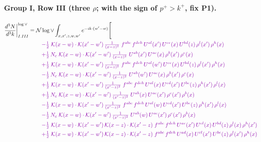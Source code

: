 \documentclass[10pt]{article}
\numberwithin{equation}{section}
\newcommand{\NNv}{\mathcal N\log\vee}
\begin{document}
\paragraph{Group I, Row III (three $\rho$; with the sign of $p^+>k^+$, fix P1).}
\begin{align}
\frac{d^3N}{d^3k}\bigg|^{\log\vee}_{I.III}={}&\NNv\int_{x,x',z,w,w'}e^{-ik\cdot(w'-w)}\Bigg[\notag\\
&\quad{\color{CC}-\tfrac{1}{2}\;\mathcal{K}(x-w)\cdot\mathcal{K}(x'-w')\,\tfrac{1}{(x-z)^{2}}\;f^{abc}\,f^{deh}\,U^{al}(x')\,U^{ce}(x)\,U^{bd}(z)\,\rho^{l}(x')\,\rho^{h}(x)}\notag\\
&\quad{\color{CC}+\tfrac{1}{2}\,N_c\;\mathcal{K}(x-w)\cdot\mathcal{K}(x'-w')\,\tfrac{1}{(x-z)^{2}}\;U^{ab}(x')\,U^{ac}(x)\,\rho^{b}(x')\,\rho^{c}(x)}\notag\\
&\quad{\color{CC}+\tfrac{1}{2}\;\mathcal{K}(x-w)\cdot\mathcal{K}(x'-w')\,\tfrac{1}{(x-z)^{2}}\;f^{abc}\,f^{deh}\,U^{al}(w')\,U^{ce}(x)\,U^{bd}(z)\,\rho^{l}(x')\,\rho^{h}(x)}\notag\\
&\quad{\color{CC}-\tfrac{1}{2}\,N_c\;\mathcal{K}(x-w)\cdot\mathcal{K}(x'-w')\,\tfrac{1}{(x-z)^{2}}\;U^{ab}(w')\,U^{ac}(x)\,\rho^{b}(x')\,\rho^{c}(x)}\notag\\
&\quad{\color{CC}+\tfrac{1}{2}\;\mathcal{K}(x-w)\cdot\mathcal{K}(x'-w')\,\tfrac{1}{(x'-z)^{2}}\;f^{abc}\,f^{deh}\,U^{al}(x)\,U^{cd}(x')\,U^{be}(z)\,\rho^{h}(x')\,\rho^{l}(x)}\notag\\
&\quad{\color{CC}+\tfrac{1}{2}\,N_c\;\mathcal{K}(x-w)\cdot\mathcal{K}(x'-w')\,\tfrac{1}{(x'-z)^{2}}\;U^{ab}(x)\,U^{ac}(x')\,\rho^{c}(x')\,\rho^{b}(x)}\notag\\
&\quad{\color{CC}-\tfrac{1}{2}\;\mathcal{K}(x-w)\cdot\mathcal{K}(x'-w')\,\tfrac{1}{(x'-z)^{2}}\;f^{abc}\,f^{deh}\,U^{al}(w)\,U^{cd}(x')\,U^{be}(z)\,\rho^{h}(x')\,\rho^{l}(x)}\notag\\
&\quad{\color{CC}-\tfrac{1}{2}\,N_c\;\mathcal{K}(x-w)\cdot\mathcal{K}(x'-w')\,\tfrac{1}{(x'-z)^{2}}\;U^{ab}(w)\,U^{ac}(x')\,\rho^{c}(x')\,\rho^{b}(x)}\notag\\
&\quad{\color{CC}-\tfrac{1}{2}\;\mathcal{K}(x-w)\cdot\mathcal{K}(x'-w')\,\mathcal{K}(x-z)\cdot\mathcal{K}(x'-z)\;f^{abc}\,f^{deh}\,U^{ae}(x')\,U^{cl}(x)\,U^{bd}(z)\,\rho^{l}(x)\,\rho^{h}(x')}\notag\\
&\quad{\color{CC}+\tfrac{1}{2}\;\mathcal{K}(x-w)\cdot\mathcal{K}(x'-w')\,\mathcal{K}(x-z)\cdot\mathcal{K}(x'-z)\;f^{abc}\,f^{deh}\,U^{ad}(x)\,U^{cl}(x')\,U^{be}(z)\,\rho^{l}(x')\,\rho^{h}(x)}\notag\\

\end{align}
\end{document}
